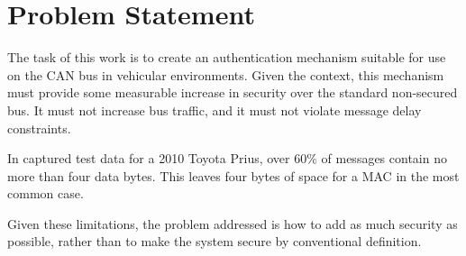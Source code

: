 \section{Problem Statement}

The task of this work is to create an authentication mechanism suitable for use on the CAN bus in vehicular environments. Given the context, this mechanism must provide some measurable increase in security over the standard non-secured bus. It must not increase bus traffic, and it must not violate message delay constraints.

In captured test data for a 2010 Toyota Prius, over 60\% of messages contain no more than four data bytes. This leaves four bytes of space for a MAC in the most common case. 

Given these limitations, the problem addressed is how to add as much security as possible, rather than to make the system secure by conventional definition.
